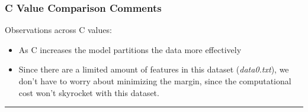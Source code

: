 \documentclass{article}
\begin{document}
\subsubsection*{C Value Comparison Comments}
\parbox{\textwidth}{
  Observations across C values:
  \begin{itemize}
    \item As C increases the model partitions the data more effectively
    \item Since there are a limited amount of features in this dataset (\textit{data0.txt}), we don't have to worry about minimizing the margin, since the computational cost won't skyrocket with this dataset.
  \end{itemize}
}
\noindent\rule{\textwidth}{0.4pt}\\
\end{document}
